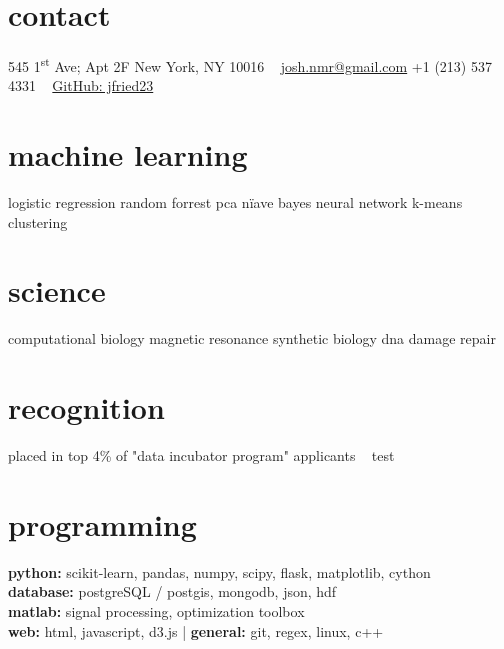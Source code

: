 \documentclass[]{friggeri-cv} %
\begin{document}


\begin{aside} %
\section{contact}
545 1\textsuperscript{st} Ave; Apt 2F
New York, NY 10016
~
\href{mailto:josh.nmr@gmail.com}{josh.nmr@gmail.com}{\color{brown} } 
+1 (213) 537 4331{\color{brown} }
~
\href{https://github.com/jfried23}{GitHub: jfried23}
\section{machine learning}
logistic regression
random forrest
pca
n{\"i}ave bayes
neural network
k-means clustering
\section{science}
computational biology
magnetic resonance
synthetic biology
dna damage repair
\section{recognition}
placed in top 4\% of "data incubator program" applicants 
~
test
\end{aside}


\section{programming}

\textbf{python:} scikit-learn, pandas, numpy, scipy, flask, matplotlib, cython  \\ \textbf{database:} postgreSQL / postgis, mongodb, json, hdf \\ \textbf{matlab:} signal processing, optimization toolbox \\ \textbf{web:} html, javascript, d3.js  |  \textbf{general:} git, regex, linux, c++
\end{document}
